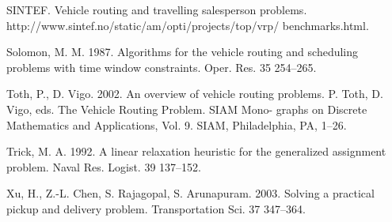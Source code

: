 \begin{thebibliography}{9}
	SINTEF. Vehicle routing and travelling salesperson problems. http://www.sintef.no/static/am/opti/projects/top/vrp/ benchmarks.html.

	Solomon, M. M. 1987. Algorithms for the vehicle routing and scheduling problems with time window constraints. Oper. Res. 35 254–265.

	Toth, P., D. Vigo. 2002. An overview of vehicle routing problems. P. Toth, D. Vigo, eds. The Vehicle Routing Problem. SIAM Mono- graphs on Discrete Mathematics and Applications, Vol. 9. SIAM, Philadelphia, PA, 1–26.

	Trick, M. A. 1992. A linear relaxation heuristic for the generalized assignment problem. Naval Res. Logist. 39 137–152.

	Xu, H., Z.-L. Chen, S. Rajagopal, S. Arunapuram. 2003. Solving a practical pickup and delivery problem. Transportation Sci. 37 347–364.
\end{thebibliography}